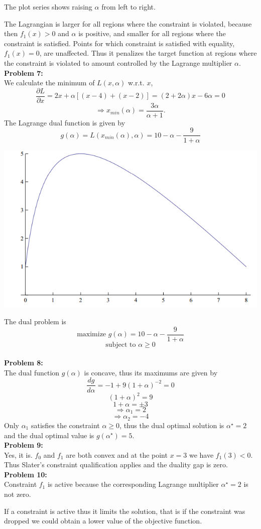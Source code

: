 \documentclass{article}
\begin{document}
The plot series shows raising $\alpha$ from left to right.

The Lagrangian is larger for all regions where the constraint is violated, because then $f_1(x)>0$ and $\alpha$ is positive, and smaller for all regions where the constraint is satisfied. Points for which constraint is satisfied with equality, $f_1(x) = 0$, are unaffected. Thus it penalizes the target function at regions where the constraint is violated to amount controlled by the Lagrange multiplier $\alpha$.
\\

\textbf{Problem 7:}\\
We calculate the minimum of $L(x, \alpha)$ w.r.t. $x$,
$$\frac{\partial L}{\partial x} = 2x+\alpha[(x-4)+(x-2)] = (2+2\alpha)x-6\alpha = 0$$
$$\Rightarrow x_{min}(\alpha) = \frac{3\alpha}{\alpha+1}.$$
The Lagrange dual function is given by
$$g(\alpha) = L(x_{min}(\alpha), \alpha) = 10-\alpha-\frac{9}{1+\alpha}$$

\begin{center}
	\includegraphics[scale=0.3]{img3}
\end{center}

The dual problem is
$$\text{maximize }g(\alpha) = 10-\alpha-\frac{9}{1+\alpha}$$
$$\text{subject to }\alpha \geq 0$$
\\

\textbf{Problem 8:}\\
The dual function $g(\alpha)$ is concave, thus its maximums are given by
$$\frac{dg}{d\alpha}=-1+9(1+\alpha)^{-2}=0$$
$$(1+\alpha)^2 = 9$$
$$1+\alpha = \pm3$$
$$\Rightarrow \alpha_1 = 2$$
$$\Rightarrow \alpha_2 = -4$$
Only $\alpha_1$ satisfies the constraint $\alpha\geq 0$, thus the dual optimal solution is $\alpha^{\star} = 2$ and the dual optimal value is $g(\alpha^{\star}) = 5$.
\\

\textbf{Problem 9:}\\
Yes, it is. $f_0$ and $f_1$ are both convex and at the point $x = 3$ we have $f_1(3) < 0$. Thus Slater's constraint qualification applies and the duality gap is zero.
\\

\textbf{Problem 10:}\\
Constraint $f_1$ is active because the corresponding Lagrange multiplier $\alpha^{\star} = 2$ is not zero.

If a constraint is active thus it limits the solution, that is if the constraint was dropped we could obtain a lower value of the objective function.
\end{document}
